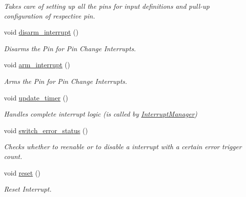 \begin{DoxyCompactItemize}
\begin{DoxyCompactList}\small\item\em Takes care of setting up all the pins for input definitions and pull-\/up configuration of respective pin. \end{DoxyCompactList}\item 
void \hyperlink{classSPMB_1_1InterruptInput_a434a4a22e379f9d3e70340ca638ef0d9}{disarm\+\_\+interrupt} ()\hypertarget{classSPMB_1_1InterruptInput_a434a4a22e379f9d3e70340ca638ef0d9}{}\label{classSPMB_1_1InterruptInput_a434a4a22e379f9d3e70340ca638ef0d9}

\begin{DoxyCompactList}\small\item\em Disarms the Pin for Pin Change Interrupts. \end{DoxyCompactList}\item 
void \hyperlink{classSPMB_1_1InterruptInput_a6f677f7648a3252791ab61df4c5e64b6}{arm\+\_\+interrupt} ()\hypertarget{classSPMB_1_1InterruptInput_a6f677f7648a3252791ab61df4c5e64b6}{}\label{classSPMB_1_1InterruptInput_a6f677f7648a3252791ab61df4c5e64b6}

\begin{DoxyCompactList}\small\item\em Arms the Pin for Pin Change Interrupts. \end{DoxyCompactList}\item 
void \hyperlink{classSPMB_1_1InterruptInput_af827e44330f1054bdfdb28861dbd6505}{update\+\_\+timer} ()\hypertarget{classSPMB_1_1InterruptInput_af827e44330f1054bdfdb28861dbd6505}{}\label{classSPMB_1_1InterruptInput_af827e44330f1054bdfdb28861dbd6505}

\begin{DoxyCompactList}\small\item\em Handles complete interrupt logic (is called by \hyperlink{classSPMB_1_1InterruptManager}{Interrupt\+Manager}) \end{DoxyCompactList}\item 
void \hyperlink{classSPMB_1_1InterruptInput_a454efe88ea6a9c5047e5c34b9d1f7e4b}{switch\+\_\+error\+\_\+status} ()\hypertarget{classSPMB_1_1InterruptInput_a454efe88ea6a9c5047e5c34b9d1f7e4b}{}\label{classSPMB_1_1InterruptInput_a454efe88ea6a9c5047e5c34b9d1f7e4b}

\begin{DoxyCompactList}\small\item\em Checks whether to reenable or to disable a interrupt with a certain error trigger count. \end{DoxyCompactList}\item 
void \hyperlink{classSPMB_1_1InterruptInput_adb38e98b59d2c4487bedd00eba453ab2}{reset} ()\hypertarget{classSPMB_1_1InterruptInput_adb38e98b59d2c4487bedd00eba453ab2}{}\label{classSPMB_1_1InterruptInput_adb38e98b59d2c4487bedd00eba453ab2}

\begin{DoxyCompactList}\small\item\em Reset Interrupt. \end{DoxyCompactList}\end{DoxyCompactItemize}
